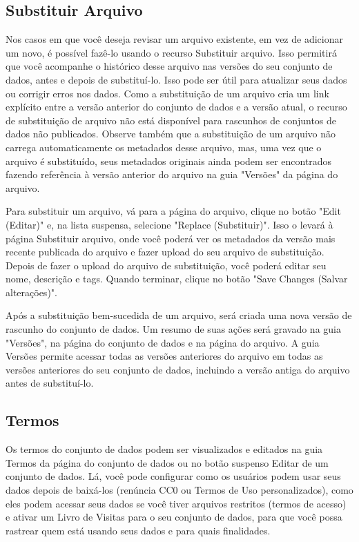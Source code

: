 \documentclass[12pt,hidelinks]{article}
\begin{document}
    \subsection{Substituir Arquivo}
    
\qquad Nos casos em que você deseja revisar um arquivo existente, em vez de adicionar um novo, é possível fazê-lo usando o recurso Substituir arquivo. Isso permitirá que você acompanhe o histórico desse arquivo nas versões do seu conjunto de dados, antes e depois de substituí-lo. Isso pode ser útil para atualizar seus dados ou corrigir erros nos dados. Como a substituição de um arquivo cria um link explícito entre a versão anterior do conjunto de dados e a versão atual, o recurso de substituição de arquivo não está disponível para rascunhos de conjuntos de dados não publicados. Observe também que a substituição de um arquivo não carrega automaticamente os metadados desse arquivo, mas, uma vez que o arquivo é substituído, seus metadados originais ainda podem ser encontrados fazendo referência à versão anterior do arquivo na guia "Versões" da página do arquivo.

Para substituir um arquivo, vá para a página do arquivo, clique no botão "Edit (Editar)" e, na lista suspensa, selecione "Replace (Substituir)". Isso o levará à página Substituir arquivo, onde você poderá ver os metadados da versão mais recente publicada do arquivo e fazer upload do seu arquivo de substituição. Depois de fazer o upload do arquivo de substituição, você poderá editar seu nome, descrição e tags. Quando terminar, clique no botão "Save Changes (Salvar alterações)".

Após a substituição bem-sucedida de um arquivo, será criada uma nova versão de rascunho do conjunto de dados. Um resumo de suas ações será gravado na guia "Versões", na página do conjunto de dados e na página do arquivo. A guia Versões permite acessar todas as versões anteriores do arquivo em todas as versões anteriores do seu conjunto de dados, incluindo a versão antiga do arquivo antes de substituí-lo.
    
    \subsection{Termos}
    
\qquad Os termos do conjunto de dados podem ser visualizados e editados na guia Termos da página do conjunto de dados ou no botão suspenso Editar de um conjunto de dados. Lá, você pode configurar como os usuários podem usar seus dados depois de baixá-los (renúncia CC0 ou Termos de Uso personalizados), como eles podem acessar seus dados se você tiver arquivos restritos (termos de acesso) e ativar um Livro de Visitas para o seu conjunto de dados, para que você possa rastrear quem está usando seus dados e para quais finalidades.
    
\end{document}
